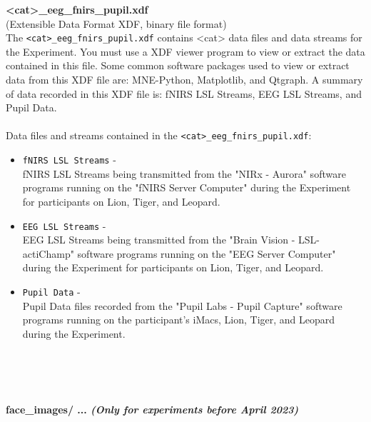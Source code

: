 \begin{description}
\begin{addmargin}[0em]{0em}
    \begin{addmargin}[1em]{0em} %
        \textbf{<cat>\_eeg\_fnirs\_pupil.xdf}\\
        (Extensible Data Format XDF, binary file format)\\
        The \verb|<cat>_eeg_fnirs_pupil.xdf| contains <cat> data files and data streams for the Experiment.
        You must use a XDF viewer program to view or extract the data contained in this file.
        Some common software packages used to view or extract data from this XDF file are: MNE-Python, Matplotlib, and Qtgraph.
        A summary of data recorded in this XDF file is: fNIRS LSL Streams, EEG LSL Streams, and Pupil Data.\\\\
        Data files and streams contained in the \verb|<cat>_eeg_fnirs_pupil.xdf|:
        \begin{itemize}
            \item \verb|fNIRS LSL Streams| -\\fNIRS LSL Streams being transmitted from the "NIRx - Aurora" software programs running on the "fNIRS Server Computer" during the Experiment for participants on Lion, Tiger, and Leopard.
            \item \verb|EEG LSL Streams| -\\EEG LSL Streams being transmitted from the "Brain Vision - LSL-actiChamp" software programs running on the "EEG Server Computer" during the Experiment for participants on Lion, Tiger, and Leopard.
            \item \verb|Pupil Data| -\\Pupil Data files recorded from the "Pupil Labs - Pupil Capture" software programs running on the participant's iMacs, Lion, Tiger, and Leopard during the Experiment.
        \end{itemize}
    \end{addmargin} %

\end{addmargin} %


\textbf{\\\\\\}
\begin{addmargin}[0em]{0em} %
    \textbf{face\_images/ ... \textit{(Only for experiments before April 2023)}}


\end{addmargin}
\end{description}
